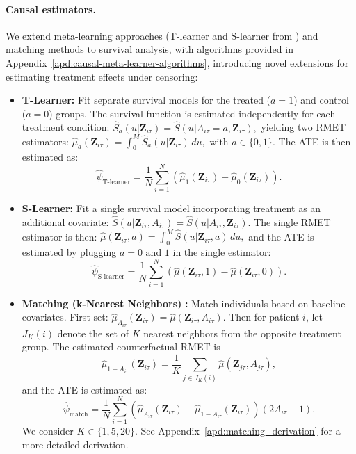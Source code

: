 \paragraph{Causal estimators.}  
We extend meta-learning approaches (T-learner and S-learner from \citet{kunzel2019metalearners}) and matching methods to survival analysis, with algorithms provided in Appendix~\ref{apd:causal-meta-learner-algorithms}, introducing novel extensions for estimating treatment effects under censoring:
\begin{itemize}[itemsep=0pt]
    \item \textbf{T-Learner:}
    Fit separate survival models for the treated (\(a=1\)) and control (\(a=0\)) groups. 
    The survival function is estimated independently for each treatment condition:
    \(
    \widehat{S}_a (u | \mathbf{Z}_{i\tau}) = {\widehat{S}(u | A_{i\tau} = a, \mathbf{Z}_{i\tau})},
    \)
    yielding two RMET estimators:
    \(
    \widehat{\mu}_a (\mathbf{Z}_{i\tau}) = \int_0^{M} \widehat{S}_a (u | \mathbf{Z}_{i\tau}) \, du,
    \)
    with \(a\in\{0,1\}\). The ATE is then estimated as:
    \[
    \widehat{\psi}_{\text{T-learner}} = \frac{1}{N} \sum_{i=1}^{N} \left( \widehat{\mu}_1 (\mathbf{Z}_{i\tau}) - \widehat{\mu}_0 (\mathbf{Z}_{i\tau}) \right).
    \]

    \item \textbf{S-Learner:} Fit a single survival model incorporating treatment as an additional covariate:
    \(
    \widehat{S}(u | \mathbf{Z}_{i\tau}, A_{i\tau}) = \widehat{S}(u | A_{i\tau}, \mathbf{Z}_{i\tau}).
    \)
    The single RMET estimator is then:
    \(
    \widehat{\mu} (\mathbf{Z}_{i\tau}, a) = \int_0^{M} \widehat{S}(u | \mathbf{Z}_{i\tau}, a) \, du,
    \)
    and the ATE is estimated by plugging \(a=0\text{ and } 1\) in the single estimator:
    \[
    \widehat{\psi}_{\text{S-learner}} = \frac{1}{N} \sum_{i=1}^{N} \left( \widehat{\mu} (\mathbf{Z}_{i\tau},1) - \widehat{\mu} (\mathbf{Z}_{i\tau},0) \right).
    \]

    \item \textbf{Matching (k-Nearest Neighbors)} \citep{stuart2010matching}\textbf{:}  
    Match individuals based on baseline covariates. 
    First set: \(
    \widehat{\mu}_{A_{i\tau}} (\mathbf{Z}_{i\tau}) = \widehat{\mu} (\mathbf{Z}_{i\tau}, A_{i\tau})
    \).
    Then for patient \(i\), let \(J_K(i)\) denote the set of \(K\) nearest neighbors from the opposite treatment group. The estimated counterfactual RMET is
    \[
    \widehat{\mu}_{1-A_{i\tau}}(\mathbf{Z}_{i\tau}) = \frac{1}{K} \sum_{j \in J_K(i)} \widehat{\mu}(\mathbf{Z}_{j\tau}, A_{j\tau}),
    \]
    and the ATE is estimated as:
    \footnotesize
    \[
    \widehat{\psi}_{\text{match}} = \frac{1}{N} \sum_{i=1}^{N} \left(\widehat{\mu}_{A_{i\tau}}(\mathbf{Z}_{i\tau}) - \widehat{\mu}_{1-A_{i\tau}}(\mathbf{Z}_{i\tau})\right)(2A_{i\tau} - 1).
    \]
    \normalsize
    We consider \(K \in \{1,5,20\}\).
    See Appendix~\ref{apd:matching_derivation} for a more detailed derivation.
    

\end{itemize}
